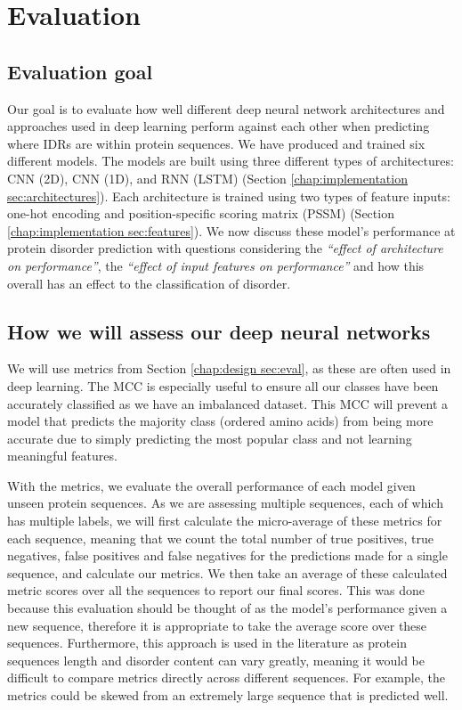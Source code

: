 \documentclass{l4proj}
\begin{document}
\chapter{Evaluation}
\label{chap:evaluation}

\section{Evaluation goal}

Our goal is to evaluate how well different deep neural network architectures and approaches used in deep learning perform against each other when predicting where IDRs are within protein sequences. We have produced and trained six different models. The models are built using three different types of architectures: CNN (2D), CNN (1D), and RNN (LSTM) (Section \ref{chap:implementation sec:architectures}). Each architecture is trained using two types of feature inputs: one-hot encoding and position-specific scoring matrix (PSSM) (Section \ref{chap:implementation sec:features}). We now discuss these model’s performance at protein disorder prediction with questions considering the \textit{“effect of architecture on performance”}, the \textit{“effect of input features on performance”} and how this overall has an effect to the classification of disorder.

\section{How we will assess our deep neural networks}

We will use metrics from Section \ref{chap:design sec:eval}, as these are often used in deep learning. The MCC is especially useful to ensure all our classes have been accurately classified as we have an imbalanced dataset. This MCC will prevent a model that predicts the majority class (ordered amino acids) from being more accurate due to simply predicting the most popular class and not learning meaningful features.

With the metrics, we evaluate the overall performance of each model given unseen protein sequences. As we are assessing multiple sequences, each of which has multiple labels, we will first calculate the micro-average of these metrics for each sequence, meaning that we count the total number of true positives, true negatives, false positives and false negatives for the predictions made for a single sequence, and calculate our metrics. We then take an average of these calculated metric scores over all the sequences to report our final scores. This was done because this evaluation should be thought of as the model's performance given a new sequence, therefore it is appropriate to take the average score over these sequences. Furthermore, this approach is used in the literature as protein sequences length and disorder content can vary greatly, meaning it would be difficult to compare metrics directly across different sequences. For example, the metrics could be skewed from an extremely large sequence that is predicted well.
\end{document}

